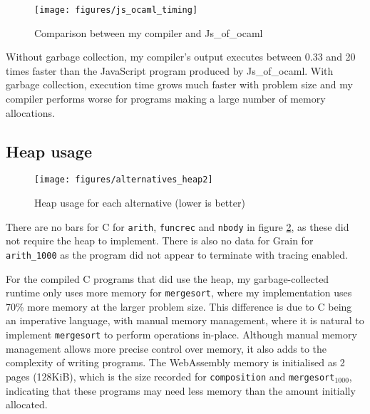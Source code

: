 \begin{figure}[H]
\hspace{-1.6cm}
\texttt{[image: figures/js\_ocaml\_timing]}
\vspace{-0.5cm}
\caption{Comparison between my compiler and Js\_of\_ocaml}
 \label{fig:js_oc_timing} 
\end{figure}

Without garbage collection, my compiler's output	executes between 0.33 and 20 times faster than the JavaScript program produced by  Js\_of\_ocaml. With garbage collection, execution time grows much faster with problem size and my compiler performs worse for programs making a large number of memory allocations.



\subsection{Heap usage}

\begin{figure}[H]
\hspace{-1cm}
\texttt{[image: figures/alternatives\_heap2]}
\vspace{-0.5cm}
\caption{Heap usage for each alternative (lower is better)}
 \label{fig:alt_heap} 
\end{figure}

There are no bars for C for \verb|arith|, \verb|funcrec| and \verb|nbody| in figure \ref{fig:alt_heap}, as these did not require the heap to implement. 
There is also no data for Grain for \verb|arith_1000| as the program did not appear to terminate with tracing enabled.

For the compiled C programs that did use the heap, my garbage-collected runtime only uses more memory for \verb|mergesort|, where my implementation uses 70\% more memory at the larger problem size. This difference is due to C being an imperative language, with manual memory management, where it is natural to implement \verb|mergesort| to perform operations in-place. Although manual memory management allows more precise control over memory, it also adds to the complexity of writing programs.
The WebAssembly memory is initialised as 2 pages (128KiB), which is the size recorded for \verb|composition| and \verb|mergesort|$_{1000}$, indicating that these programs may need less memory than the amount initially allocated.


